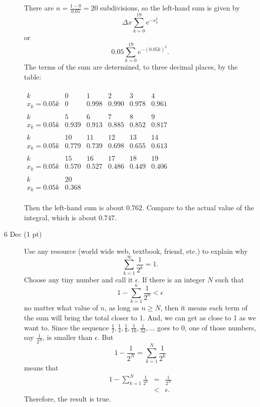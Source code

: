 \documentclass[11pt,letterpaper]{article}
\begin{document}
\begin{description}
\vspace{0.5pc}
There are $n=\frac{1-0}{0.05}=20$ subdivisions, so the left-hand sum is given by
\[\Delta x\sum_{k=0}^{19}e^{-x_k^2}\]
or
\[0.05\sum_{k=0}^{19}e^{-(0.05k)^2}.\]
The terms of the sum are determined, to three decimal places, by the table:
\begin{center}
$\begin{array}{r|ccccc}
&&&&& \\
k & 0 & 1 & 2 & 3 & 4 \\
x_k=0.05k & 0 & 0.998 & 0.990 & 0.978 & 0.961 \\
&&&&& \\
k & 5 & 6 & 7 & 8 & 9 \\
x_k=0.05k & 0.939 & 0.913 & 0.885 & 0.852 & 0.817 \\
&&&&& \\
k & 10 & 11 & 12 & 13 & 14 \\
x_k=0.05k & 0.779 & 0.739 & 0.698 & 0.655 & 0.613 \\
&&&&& \\
k & 15 & 16 & 17 & 18 & 19 \\
x_k=0.05k & 0.570 & 0.527 & 0.486 & 0.449 & 0.406 \\
&&&&& \\
k & 20 &&&&\\
x_k=0.05k & 0.368 &&&& \\
&&&&&
\end{array}$
\end{center}

Then the left-hand sum is about $0.762$.  Compare to the actual value of the integral, which is about $0.747$.

\item[6 Dec (1 pt)]  Use any resource (world wide web, textbook, friend, etc.) to explain why
\[\sum_{k=1}^{\infty }\frac{1}{2^k}=1.\]
Choose any tiny number and call it $\epsilon $.  If there is an integer $N$ such that 
\[1-\sum_{k=1}^{n}\frac{1}{2^n}<\epsilon \]
no matter what value of $n$, as long as $n\geq N$, then it means each term of the sum will bring the total closer to 1.  And, we can get as close to 1 as we want to.  Since the sequence $\frac{1}{2}, \frac{1}{4}, \frac{1}{8}, \frac{1}{16}, \frac{1}{32}, \dots $ goes to 0, one of those numbers, say $\frac{1}{2^N}$, is smaller than $\epsilon $.  But
\[1-\frac{1}{2^N}=\sum_{k=1}^N\frac{1}{2^k}\]
means that
\begin{eqnarray*}
 1-\sum_{k=1}^N\frac{1}{2^k} &=& \frac{1}{2^N} \\
&<& \epsilon .
\end{eqnarray*}
Therefore, the result is true.

 \end{description}
\end{document}
